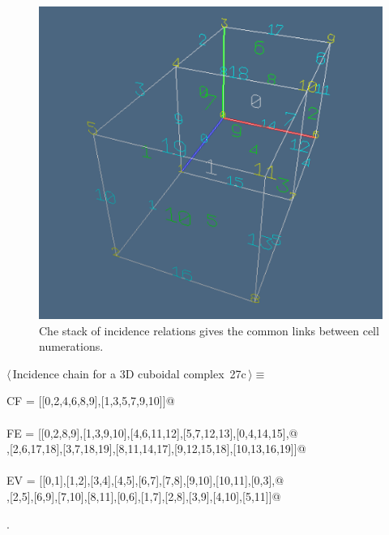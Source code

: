 \documentclass[11pt,oneside]{article}    %
\begin{document}
\begin{figure}[htbp] %
   \centering
   \includegraphics[width=0.5\linewidth]{images/incidenceChain} 
   \caption{Che stack of incidence relations gives the common links between cell numerations.}
   \label{incidenceChain}
\end{figure}


\begin{flushleft} \small \label{scrap46}
\protect{}$\langle\,$Incidence chain for a 3D cuboidal complex\nobreak\ {\footnotesize 27c}$\,\rangle\equiv$
\vspace{-1ex}
\begin{list}{}{} \item
\mbox{}\verb@incidence CF = [[0,2,4,6,8,9],[1,3,5,7,9,10]]@\\
\mbox{}\verb@@\\
\mbox{}\verb@incidence FE = [[0,2,8,9],[1,3,9,10],[4,6,11,12],[5,7,12,13],[0,4,14,15],@\\
\mbox{}\verb@[1,5,15,16],[2,6,17,18],[3,7,18,19],[8,11,14,17],[9,12,15,18],[10,13,16,19]]@\\
\mbox{}\verb@@\\
\mbox{}\verb@incidence EV = [[0,1],[1,2],[3,4],[4,5],[6,7],[7,8],[9,10],[10,11],[0,3],@\\
\mbox{}\verb@[1,4],[2,5],[6,9],[7,10],[8,11],[0,6],[1,7],[2,8],[3,9],[4,10],[5,11]]@\\
\mbox{}\verb@@{\NWsep}
\end{list}
\vspace{-1ex}
\footnotesize\addtolength{\baselineskip}{-1ex}
\begin{list}{}{\setlength{\itemsep}{-\parsep}\setlength{\itemindent}{-\leftmargin}}
\item {\NWtxtMacroNoRef}.
\end{list}
\end{flushleft}
\end{document}
